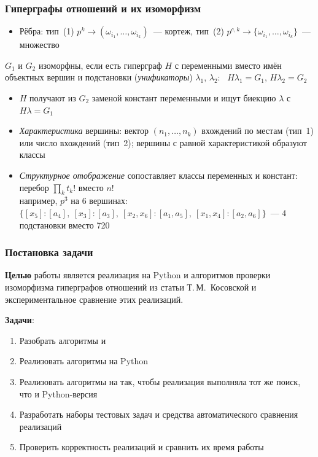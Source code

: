 \documentclass[aspectratio=169]{beamer}
\begin{document}
\begin{frame}
  \frametitle{Гиперграфы отношений и их изоморфизм}
  \begin{itemize}
    \item Рёбра: тип~(1) $p^k \to (\omega_{i_1}, \dots, \omega_{i_k})$~--- кортеж, тип~(2) $p^{c,k} \to \{\omega_{i_1}, \dots, \omega_{i_k}\}$~--- множество
  \end{itemize}
  \begin{rudefinition}
    $G_1$ и $G_2$ изоморфны, если есть гиперграф $H$ с переменными вместо имён объектных вершин и подстановки (\emph{унификаторы}) $\lambda_1$, $\lambda_2$: \ $H\lambda_1 = G_1$, $H\lambda_2 = G_2$
  \end{rudefinition}
  \begin{itemize}
    \item $H$ получают из $G_2$ заменой констант переменными и ищут биекцию $\lambda$ с $H\lambda = G_1$
    \item \emph{Характеристика} вершины: вектор $(n_1, \dots, n_k)$ вхождений по местам (тип~1) или число вхождений (тип~2); вершины с равной характеристикой образуют классы
    \item \emph{Структурное отображение} сопоставляет классы переменных и констант: перебор $\prod_k t_k!$ вместо $n!$ \\
          {\small например, $p^3$ на 6 вершинах: $\{[x_5]:[a_4],\ [x_3]:[a_3],\ [x_2, x_6]:[a_1, a_5],\ [x_1, x_4]:[a_2, a_6]\}$~--- 4 подстановки вместо 720}
  \end{itemize}
\end{frame}

\begin{frame}
  \frametitle{Постановка задачи}
  \textbf{Целью} работы является реализация на Python и \Cpp{} алгоритмов проверки изоморфизма гиперграфов отношений из статьи Т.\,М.~Косовской и экспериментальное сравнение этих реализаций.

  \medskip
  \textbf{Задачи}:
  \begin{enumerate}
    \item Разобрать алгоритмы \ISOMone{} и \ISOMn{}
    \item Реализовать алгоритмы на Python
    \item Реализовать алгоритмы на \Cpp{} так, чтобы реализация выполняла тот же поиск, что и Python-версия
    \item Разработать наборы тестовых задач и средства автоматического сравнения реализаций
    \item Проверить корректность реализаций и сравнить их время работы
  \end{enumerate}
\end{frame}
\end{document}
